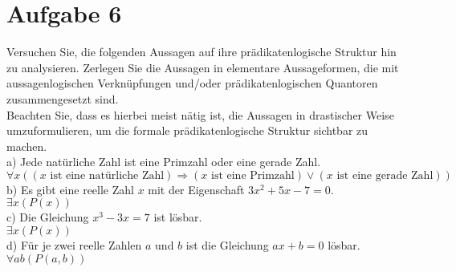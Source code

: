 \section*{Aufgabe 6}

Versuchen Sie, die folgenden Aussagen auf ihre prädikatenlogische Struktur hin zu analysieren. Zerlegen Sie die Aussagen in elementare Aussageformen, die mit aussagenlogischen Verknüpfungen und/oder prädikatenlogischen Quantoren zusammengesetzt sind.\\

Beachten Sie, dass es hierbei meist nätig ist, die Aussagen in drastischer Weise umzuformulieren, um die formale prädikatenlogische Struktur sichtbar zu machen.\\

a) Jede natürliche Zahl ist eine Primzahl oder eine gerade Zahl.\\

$\forall x ((x \text{ ist eine natürliche Zahl}) \Rightarrow (x \text{ ist eine Primzahl}) \lor (x \text{ ist eine gerade Zahl}))$\\

b) Es gibt eine reelle Zahl $x$ mit der Eigenschaft $3x^2 + 5x - 7 = 0$.\\

$\exists x (P(x))$\\

c) Die Gleichung $x^3 - 3x = 7$ ist lösbar.\\

$\exists x (P(x))$\\

d) Für je zwei reelle Zahlen $a$ und $b$ ist die Gleichung $ax + b = 0$ lösbar.\\

$\forall ab (P(a,b))$